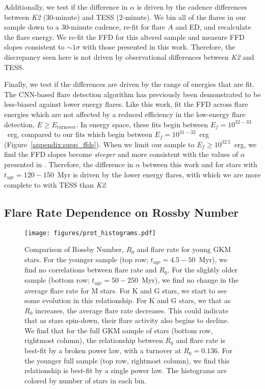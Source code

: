 \documentclass[twocolumn, linenumbers]{aastex631}
\begin{document}
Additionally, we test if the difference in $\alpha$ is driven by the cadence
differences between \textit{K2} (30-minute) and TESS (2-minute). We bin all of
the flares in our sample down to a 30-minute cadence, re-fit for flare $A$ and ED,
and recalculate the flare energy. We re-fit the FFD for this altered sample and
measure  FFD slopes consistent to $\sim 1 \sigma$ with those presented in this work.
Therefore, the discrepancy seen here is not driven by observational differences
between \textit{K2} and TESS.

Finally, we test if the differences are driven by the range of energies that are fit.
The CNN-based flare detection algorithm has previously been demonstrated to be
less-biased against lower energy flares. Like this work, \cite{ilin21} fit the FFD
across flare energies which are not affected by a reduced efficiency in the low-energy
flare detection, $E \geq E_\textrm{turnover}$. In energy space, these fits begin
between $E_f = 10^{32-33}$~erg, compared to our fits which begin between
$E_f = 10^{31-32}$~erg (Figure~\ref{appendix:supp_ffds}). When we limit our sample
to $E_f \geq 10^{32.5}$~erg, we find the FFD slopes become \textit{steeper} and
more consistent with the values of $\alpha$ presented in \cite{ilin21}. Therefore,
the difference in $\alpha$ between this work and \cite{ilin21} for stars with
$t_\textrm{age} = 120 - 150$~Myr is driven by the lower energy flares, with which
we are more complete to with TESS than \textit{K2}.


\subsection{Flare Rate Dependence on Rossby Number}\label{subsec:rossby}

\begin{figure*}[htb!]
    \begin{centering}
        \texttt{[image: figures/prot\_histograms.pdf]}
        \caption{
            Comparison of Rossby Number, $R_0$ and flare rate for young GKM stars.
            For the younger sample (top row; $t_\textrm{age} = 4.5 - 50$~Myr), we
            find no correlations between flare rate and $R_0$. For the slightly
            older sample (bottom row; $t_\textrm{age} = 50 - 250$~Myr), we find
            no change in the average flare rate for M stars. For K and G stars,
            we start to see some evolution in this relationship. For K and G
            stars, we that as $R_0$ increases, the average flare rate decreases.
            This could indicate that as stars spin-down, their flare activity
            also begins to decline. We find that for the full GKM sample of
            stars (bottom row, rightmost column), the relationship between $R_0$
            and flare rate is best-fit by a broken power law, with a turnover
            at $R_0 = 0.136$. For the younger full sample (top row, rightmost column),
            we find this relationship is best-fit by a single power law. The
            histograms are colored by number of stars in each bin.
        }
        \label{fig:prot_histograms}
    \end{centering}
\end{figure*}
\end{document}
